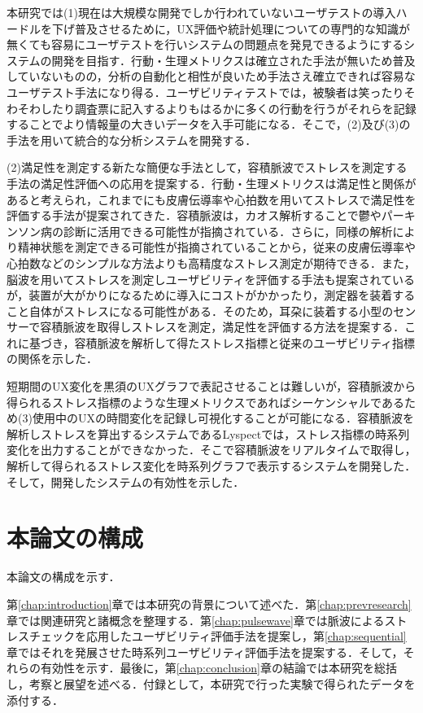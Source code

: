本研究では(1)現在は大規模な開発でしか行われていないユーザテストの導入ハードルを下げ普及させるために，UX評価や統計処理についての専門的な知識が無くても容易にユーザテストを行いシステムの問題点を発見できるようにするシステムの開発を目指す．行動・生理メトリクスは確立された手法が無いため普及していないものの，分析の自動化と相性が良いため手法さえ確立できれば容易なユーザテスト手法になり得る．ユーザビリティテストでは，被験者は笑ったりそわそわしたり調査票に記入するよりもはるかに多くの行動を行うがそれらを記録することでより情報量の大きいデータを入手可能になる\cite{tullis2014}．そこで，(2)及び(3)の手法を用いて統合的な分析システムを開発する．

(2)満足性を測定する新たな簡便な手法として，容積脈波でストレスを測定する手法の満足性評価への応用を提案する．行動・生理メトリクスは満足性と関係があると考えられ，これまでにも皮膚伝導率や心拍数を用いてストレスで満足性を評価する手法が提案されてきた．容積脈波は，カオス解析することで鬱やパーキンソン病の診断に活用できる可能性が指摘されている\cite{tuan}\cite{oyama}．さらに，同様の解析により精神状態を測定できる可能性\cite{arai}が指摘されていることから，従来の皮膚伝導率や心拍数などのシンプルな方法よりも高精度なストレス測定が期待できる．また，脳波を用いてストレスを測定しユーザビリティを評価する手法\cite{amaral}も提案されているが，装置が大がかりになるために導入にコストがかかったり，測定器を装着すること自体がストレスになる可能性がある．そのため，耳朶に装着する小型のセンサーで容積脈波を取得しストレスを測定，満足性を評価する方法を提案する．これに基づき，容積脈波を解析して得たストレス指標と従来のユーザビリティ指標の関係を示した．

短期間のUX変化を黒須のUXグラフで表記させることは難しいが，容積脈波から得られるストレス指標のような生理メトリクスであればシーケンシャルであるため(3)使用中のUXの時間変化を記録し可視化することが可能になる．容積脈波を解析しストレスを算出するシステムであるLyspect\cite{oyama2012}では，ストレス指標の時系列変化を出力することができなかった．そこで容積脈波をリアルタイムで取得し，解析して得られるストレス変化を時系列グラフで表示するシステムを開発した．そして，開発したシステムの有効性を示した．

\section{本論文の構成}

本論文の構成を示す．

第\ref{chap:introduction}章では本研究の背景について述べた．第\ref{chap:prevresearch}章では関連研究と諸概念を整理する．第\ref{chap:pulsewave}章では脈波によるストレスチェックを応用したユーザビリティ評価手法を提案し，第\ref{chap:sequential}章ではそれを発展させた時系列ユーザビリティ評価手法を提案する．そして，それらの有効性を示す．最後に，第\ref{chap:conclusion}章の結論では本研究を総括し，考察と展望を述べる．付録として，本研究で行った実験で得られたデータを添付する．
